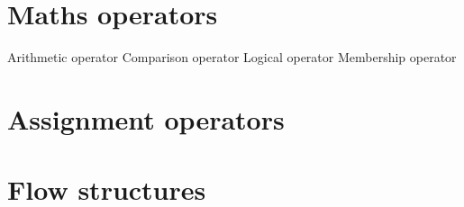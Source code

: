 %
%        
%        
%        
%        
%







\newpage
    \section{Maths operators}
Arithmetic operator 
Comparison operator 
Logical operator 
Membership operator 

    \section{Assignment operators}


    \section{Flow structures}

